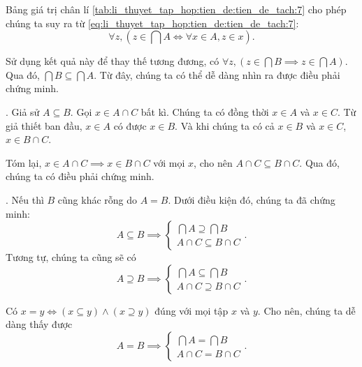 Bảng giá trị chân lí \ref{tab:li_thuyet_tap_hop:tien_de:tien_de_tach:7} cho phép chúng ta suy ra từ \eqref{eq:li_thuyet_tap_hop:tien_de:tien_de_tach:7}:
\begin{equation*}
   \forall z, \left(z \in \bigcap A \iff \forall x \in A, z\in x\right).
\end{equation*}

Sử dụng kết quả này để thay thế tương đương, có $\forall z, (z \in \bigcap B \implies z \in \bigcap A)$. Qua đó, $\bigcap B \subseteq \bigcap A$. Từ đây, chúng ta có thể dễ dàng nhìn ra được điều phải chứng minh.

. Giả sử $A \subseteq B$. Gọi $x \in A \cap C$ bất kì. Chúng ta có đồng thời $x \in A$ và $x \in C$. Từ giả thiết ban đầu, $x \in A$ có được $x \in B$. Và khi chúng ta có cả $x \in B$ và $x \in C$, $x \in B \cap C$.

Tóm lại, $x \in A \cap C \implies x \in B \cap C$ với mọi $x$, cho nên $A \cap C \subseteq B \cap C$. Qua đó, chúng ta có điều phải chứng minh.

. Nếu  thì $B$ cũng khác rỗng do $A = B$. Dưới điều kiện đó, chúng ta đã chứng minh:
\begin{equation*}
   A \subseteq B \implies
   \begin{cases}
      \bigcap A \supseteq \bigcap B \\
      A \cap C \subseteq B \cap C
   \end{cases}.
\end{equation*}
Tương tự, chúng ta cũng sẽ có
\begin{equation*}
   A \supseteq B \implies
   \begin{cases}
      \bigcap A \subseteq \bigcap B \\
      A \cap C \supseteq B \cap C
   \end{cases}.
\end{equation*}

Có $x = y \iff (x \subseteq y) \land (x \supseteq y)$ đúng với mọi tập $x$ và $y$. Cho nên, chúng ta dễ dàng thấy được
\begin{equation*}
   A = B \implies \begin{cases}
               \bigcap A = \bigcap B \\
               A \cap C = B \cap C
            \end{cases}.
\end{equation*}

